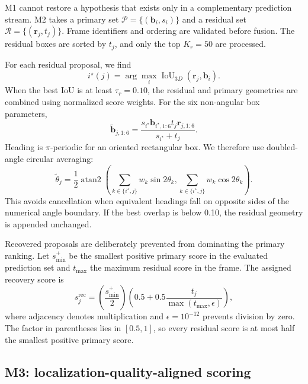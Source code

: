 \documentclass[preprint,12pt,times]{elsarticle}
\begin{document}
M1 cannot restore a hypothesis that exists only in a complementary prediction
stream. M2 takes a primary set
$\mathcal{P}=\{(\mathbf{b}_i,s_i)\}$ and a residual set
$\mathcal{R}=\{(\mathbf{r}_j,t_j)\}$. Frame identifiers and ordering are
validated before fusion. The residual boxes are sorted by $t_j$, and only the
top $K_r=50$ are processed.

For each residual proposal, we find
\begin{equation}
i^\star(j)=\arg\max_i
\operatorname{IoU}_{3D}(\mathbf{r}_j,\mathbf{b}_i).
\end{equation}
When the best IoU is at least $\tau_r=0.10$, the residual and primary
geometries are combined using normalized score weights. For the six
non-angular box parameters,
\begin{equation}
\widetilde{\mathbf{b}}_{j,1:6} =
\frac{s_{i^\star}\mathbf{b}_{i^\star,1:6}
 t_j\mathbf{r}_{j,1:6}}
{s_{i^\star}+t_j}.
\end{equation}
Heading is $\pi$-periodic for an oriented rectangular box. We therefore use
doubled-angle circular averaging:
\begin{equation}
\widetilde{\theta}_j=\frac{1}{2}\operatorname{atan2}
\left(
\sum_{k\in\{i^\star,j\}}w_k\sin 2\theta_k,
\sum_{k\in\{i^\star,j\}}w_k\cos 2\theta_k
\right).
\end{equation}
This avoids cancellation when equivalent headings fall on opposite sides of
the numerical angle boundary. If the best overlap is below 0.10, the residual
geometry is appended unchanged.

Recovered proposals are deliberately prevented from dominating the primary
ranking. Let $s_{\min}^{+}$ be the smallest positive primary score in the
evaluated prediction set and $t_{\max}$ the maximum residual score in the
frame. The assigned recovery score is
\begin{equation}
s_j^{\mathrm{rec}} =
\left(\frac{s_{\min}^{+}}{2}\right)
\left(0.5+0.5\frac{t_j}{\max(t_{\max},\epsilon)}\right),
\label{eq:recovery-score}
\end{equation}
where adjacency denotes multiplication and $\epsilon=10^{-12}$ prevents
division by zero. The factor in parentheses lies in $[0.5,1]$, so every
residual score is at most half the smallest positive primary score.

\subsection{M3: localization-quality-aligned scoring}
\end{document}
